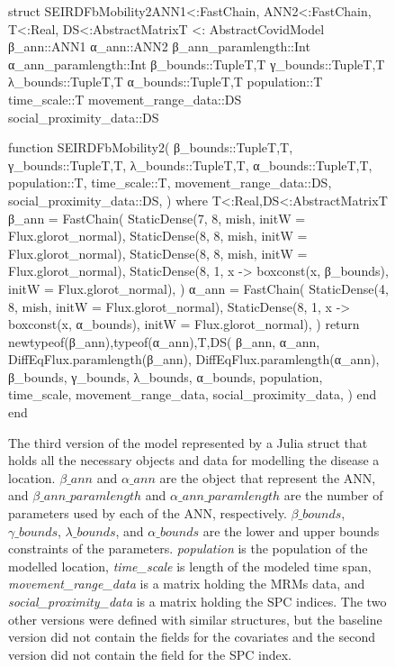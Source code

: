 \begin{figure}[!htb]
\centering
\begin{jllisting}
struct SEIRDFbMobility2{ANN1<:FastChain,
                        ANN2<:FastChain,
                        T<:Real,
                        DS<:AbstractMatrix{T}} <: AbstractCovidModel
    β_ann::ANN1
    α_ann::ANN2
    β_ann_paramlength::Int
    α_ann_paramlength::Int
    β_bounds::Tuple{T,T}
    γ_bounds::Tuple{T,T}
    λ_bounds::Tuple{T,T}
    α_bounds::Tuple{T,T}
    population::T
    time_scale::T
    movement_range_data::DS
    social_proximity_data::DS

    function SEIRDFbMobility2(
        β_bounds::Tuple{T,T},
        γ_bounds::Tuple{T,T},
        λ_bounds::Tuple{T,T},
        α_bounds::Tuple{T,T},
        population::T,
        time_scale::T,
        movement_range_data::DS,
        social_proximity_data::DS,
    ) where {T<:Real,DS<:AbstractMatrix{T}}
        β_ann = FastChain(
            StaticDense(7, 8, mish, initW = Flux.glorot_normal),
            StaticDense(8, 8, mish, initW = Flux.glorot_normal),
            StaticDense(8, 8, mish, initW = Flux.glorot_normal),
            StaticDense(8, 1,
                        x -> boxconst(x, β_bounds),
                        initW = Flux.glorot_normal),
        )
        α_ann = FastChain(
            StaticDense(4, 8, mish, initW = Flux.glorot_normal),
            StaticDense(8, 1,
                        x -> boxconst(x, α_bounds),
                        initW = Flux.glorot_normal),
        )
        return new{typeof(β_ann),typeof(α_ann),T,DS}(
            β_ann, α_ann,
            DiffEqFlux.paramlength(β_ann),
            DiffEqFlux.paramlength(α_ann),
            β_bounds, γ_bounds, λ_bounds, α_bounds,
            population, time_scale,
            movement_range_data,
            social_proximity_data,
        )
    end
end
\end{jllisting}
\caption[Julia implementation of a struct representing the model third version]{The third version of the model represented by a Julia struct that holds all the necessary objects and data for modelling the disease a location. \textit{$\beta\_ann$} and \textit{$\alpha\_ann$} are the object that represent the ANN, and \textit{$\beta\_ann\_paramlength$} and \textit{$\alpha\_ann\_paramlength$} are the number of parameters used by each of the ANN, respectively. \textit{$\beta\_bounds$}, \textit{$\gamma\_bounds$}, \textit{$\lambda\_bounds$}, and \textit{$\alpha\_bounds$} are the lower and upper bounds constraints of the parameters. \textit{population} is the population of the modelled location, \textit{time\_scale} is length of the modeled time span, \textit{movement\_range\_data} is a matrix holding the MRMs data, and \textit{social\_proximity\_data} is a matrix holding the SPC indices. The two other versions were defined with similar structures, but the baseline version did not contain the fields for the covariates and the second version did not contain the field for the SPC index.}
\label{fig:diffeq-seird-fb2-struct}
\end{figure}

